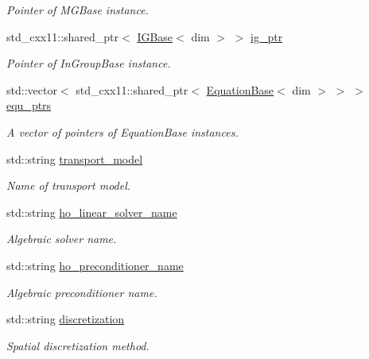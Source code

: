 \begin{DoxyCompactItemize}
\begin{DoxyCompactList}\small\item\em Pointer of M\+G\+Base instance. \end{DoxyCompactList}\item 
std\+\_\+cxx11\+::shared\+\_\+ptr$<$ \hyperlink{class_i_g_base}{I\+G\+Base}$<$ dim $>$ $>$ \hyperlink{class_bart_driver_a83323d9561c906f6094a51a5c936cea4}{ig\+\_\+ptr}
\begin{DoxyCompactList}\small\item\em Pointer of In\+Group\+Base instance. \end{DoxyCompactList}\item 
std\+::vector$<$ std\+\_\+cxx11\+::shared\+\_\+ptr$<$ \hyperlink{class_equation_base}{Equation\+Base}$<$ dim $>$ $>$ $>$ \hyperlink{class_bart_driver_a0a6f52aed8e9c22da12a99653d1acba8}{equ\+\_\+ptrs}
\begin{DoxyCompactList}\small\item\em A vector of pointers of Equation\+Base instances. \end{DoxyCompactList}\item 
std\+::string \hyperlink{class_bart_driver_a736f40f99459dc715fdb174e06626f55}{transport\+\_\+model}
\begin{DoxyCompactList}\small\item\em Name of transport model. \end{DoxyCompactList}\item 
std\+::string \hyperlink{class_bart_driver_a7dcefb31d64ad2e76d4c04a44cb26f7c}{ho\+\_\+linear\+\_\+solver\+\_\+name}
\begin{DoxyCompactList}\small\item\em Algebraic solver name. \end{DoxyCompactList}\item 
std\+::string \hyperlink{class_bart_driver_a0662a7c4208dc352aec9adf789edb463}{ho\+\_\+preconditioner\+\_\+name}
\begin{DoxyCompactList}\small\item\em Algebraic preconditioner name. \end{DoxyCompactList}\item 
std\+::string \hyperlink{class_bart_driver_a75cc884c6895beca3d3861ca226b4a3f}{discretization}
\begin{DoxyCompactList}\small\item\em Spatial discretization method. \end{DoxyCompactList}\item 

\end{DoxyCompactItemize}
